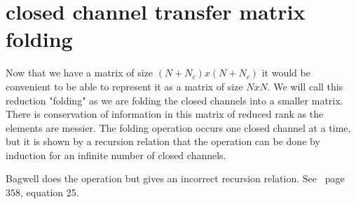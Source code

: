 \section{closed channel transfer matrix folding}

Now that we have a matrix of size $(N+N_c)x(N+N_c)$ it would be convenient to be able to represent it as a matrix of size $NxN$.  We will call this reduction "folding" as we are folding the closed channels into a smaller matrix. There is conservation of information in this matrix of reduced rank as the elements are messier.  The folding operation occurs one closed channel at a time, but it is shown by a recursion relation that the operation can be done by induction for an infinite number of closed channels.

Bagwell does the operation but gives an incorrect recursion relation. See~\cite{1990_Bagwell} page 358, equation 25.

